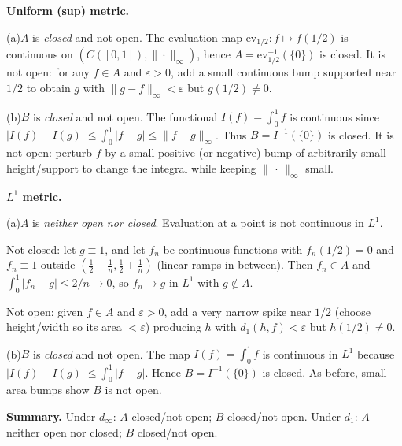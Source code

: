 \begin{solution}
\par\medskip\noindent\textbf{Uniform (sup) metric.}\quad 

	\par\noindent (a)\quad $A$ is \emph{closed} and not open. The evaluation map $\mathrm{ev}_{1/2}:f\mapsto f(1/2)$ is continuous on $(C([0,1]),\|\cdot\|_\infty)$, hence $A=\mathrm{ev}_{1/2}^{-1}(\{0\})$ is closed. It is not open: for any $f\in A$ and $\varepsilon>0$, add a small continuous bump supported near $1/2$ to obtain $g$ with $\|g-f\|_\infty<\varepsilon$ but $g(1/2)\ne 0$.
	\par\noindent (b)\quad $B$ is \emph{closed} and not open. The functional $I(f)=\int_0^1 f$ is continuous since $|I(f)-I(g)|\le \int_0^1 |f-g|\le \|f-g\|_\infty$. Thus $B=I^{-1}(\{0\})$ is closed. It is not open: perturb $f$ by a small positive (or negative) bump of arbitrarily small height/support to change the integral while keeping $\|\,\cdot\,\|_\infty$ small.

\par\medskip\noindent\textbf{$L^1$ metric.}\quad 

	\par\noindent (a)\quad $A$ is \emph{neither open nor closed}. Evaluation at a point is not continuous in $L^1$.

		\par\noindent\textbullet\quad Not closed: let $g\equiv 1$, and let $f_n$ be continuous functions with $f_n(1/2)=0$ and $f_n\equiv 1$ outside $(\tfrac12-\tfrac1n,\tfrac12+\tfrac1n)$ (linear ramps in between). Then $f_n\in A$ and $\int_0^1|f_n-g|\le 2/n\to0$, so $f_n\to g$ in $L^1$ with $g\notin A$.
		\par\noindent\textbullet\quad Not open: given $f\in A$ and $\varepsilon>0$, add a very narrow spike near $1/2$ (choose height/width so its area $<\varepsilon$) producing $h$ with $d_1(h,f)<\varepsilon$ but $h(1/2)\ne 0$.

	\par\noindent (b)\quad $B$ is \emph{closed} and not open. The map $I(f)=\int_0^1 f$ is continuous in $L^1$ because $|I(f)-I(g)|\le \int_0^1|f-g|$. Hence $B=I^{-1}(\{0\})$ is closed. As before, small-area bumps show $B$ is not open.

\par\medskip\noindent\textbf{Summary.}\quad 
Under $d_\infty$: $A$ closed/not open; $B$ closed/not open.
Under $d_1$: $A$ neither open nor closed; $B$ closed/not open.
\end{solution}

